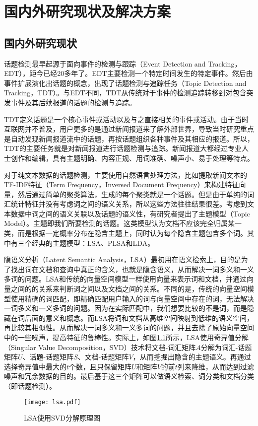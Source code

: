 \chapter{国内外研究现状及解决方案}\label{chap:RelateWorkSolvMethod}

\section{国内外研究现状}

话题检测最早起源于面向事件的检测与跟踪（Event Detection and Tracking，EDT），距今已经20多年了。EDT主要检测一个特定时间发生的特定事件。然后由事件扩展演化出话题的概念，出现了话题检测与追踪任务（Topic Detection and Tracking，TDT）\citep{allan-1998-TDT}。与EDT不同，TDT从传统对于事件的检测追踪转移到对包含突发事件及其后续报道的话题的检测与追踪。

TDT定义话题是一个核心事件或活动以及与之直接相关的事件或活动。由于当时互联网并不普及，用户更多的是通过新闻报道来了解外部世界，导致当时研究重点是自动发现新闻报道流中的话题，再按话题组织各种事件及其相应的报道。所以，TDT的主要任务就是对新闻报道进行话题检测与追踪。新闻报道大都经过专业人士创作和编辑，具有主题明确、内容正规、用词准确、噪声小、易于处理等特点。

对于纯文本数据的话题检测，主要使用自然语言处理方法，比如提取新闻文本的TF-IDF特征（Term Frequency，Inversed Document Frequency）\citep{salton1988tfidf}来构建特征向量，然后通过简单的聚类算法，生成的每个聚类就是一个话题。但是由于单纯的词汇统计特征并没有考虑词之间的语义关系，所以这些方法往往结果很差。考虑到文本数据中词之间的语义关联以及话题的语义性，有研究者提出了主题模型（Topic Model）。主题即我们所要检测的话题。这类模型认为文档不应该完全归属某一类，而是根据一定概率分布在隐含主题上，同时认为每个隐含主题包含多个词。其中有三个经典的主题模型：LSA、PLSA和LDA。

隐语义分析（Latent Semantic Analysis，LSA）\citep{deerwester1990indexing}最初用在语义检索上，目的是为了找出词在文档和查询中真正的含义，也就是隐含语义，从而解决一词多义和一义多词的问题。LSA和传统的向量空间模型一样使用向量来表示词和文档，并通过向量之间的的关系来判断词之间以及文档之间的关系。不同的是，传统的向量空间模型使用精确的词匹配，即精确匹配用户输入的词与向量空间中存在的词，无法解决一词多义和一义多词的问题。因为在实际匹配中，我们想要比较的不是词，而是隐藏在词后面的意义和概念。而LSA将词和文档从高维空间映射到低维的语义空间，再比较其相似性。从而解决一词多义和一义多词的问题，并且去除了原始向量空间中的一些噪声，提高特征的鲁棒性。实际上，如图\ref{fig:lsa}所示，LSA使用奇异值分解（Singular Value Decomposition，SVD）技术将文档-词汇矩阵$A$分解为词汇-话题矩阵$U$、话题-话题矩阵$S$、文档-话题矩阵$V$，从而挖掘出隐含的主题语义。再通过选择奇异值中最大的$t$个数，且只保留矩阵$U$和矩阵$V$的前$t$列来降维，从而达到过滤噪声和冗余数据的目的。最后基于这三个矩阵可以做语义检索、词分类和文档分类（即话题检测）。
\begin{figure}[!htbp]
    \centering
    \texttt{[image: lsa.pdf]}
    \caption{LSA使用SVD分解原理图}
    \label{fig:lsa}
\end{figure}

